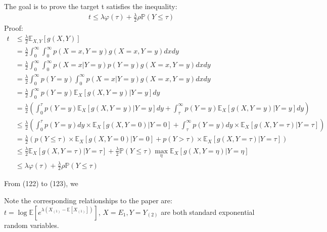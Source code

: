 \documentclass{article}
\theoremstyle{plain}
\begin{document}
The goal is to prove the target t satisfies the inequality:\\
\begin{align}
    t \leq \lambda \varphi(\tau) + \frac{\lambda}{2} \rho \mathbb{P}(Y \leq \tau)
\end{align}
Proof:
\begin{align}
    t & \leq  \frac{\lambda}{2} \mathbb{E}_{X, Y}[g(X, Y)]\\
    & = \frac{\lambda}{2}\int _0^{\infty} \int_0^{\infty} p(X = x, Y = y) g(X = x, Y = y) dxdy\\
    & = \frac{\lambda}{2}\int _0^{\infty} \int_0^{\infty} p(X = x|Y = y) p(Y = y)g(X = x, Y = y) dxdy\\
    & = \frac{\lambda}{2}\int _0^{\infty} p(Y = y) \int_0^{\infty} p(X = x|Y = y) g(X = x, Y = y) dxdy\\
    & = \frac{\lambda}{2}\int _0^{\infty} p(Y = y) \mathbb{E}_X[g(X, Y = y)| Y = y]dy\\
    & = \frac{\lambda}{2}\left(\int _0^{\tau} p(Y = y) \mathbb{E}_X[g(X, Y = y)| Y = y]dy + \int _\tau^{\infty} p(Y = y) \mathbb{E}_X[g(X, Y = y)| Y = y]dy\right)\\
    & \leq \frac{\lambda}{2}\left(\int _0^{\tau} p(Y = y) dy \times \mathbb{E}_X[g(X, Y = 0)| Y = 0] + \int _\tau^{\infty} p(Y = y) dy \times \mathbb{E}_X[g(X, Y = \tau)| Y = \tau] \right)\\
    & = \frac{\lambda}{2}\left(p(Y \leq \tau) \times \mathbb{E}_X[g(X, Y = 0)| Y = 0] + p(Y > \tau) \times \mathbb{E}_X[g(X, Y = \tau)| Y = \tau] \right)\\
    & \leq \frac{\lambda}{2} \mathbb{E}_X[g(X, Y = \tau)|Y = \tau] + \frac{\lambda}{2} \mathbb{P}(Y \leq \tau) \max_{\eta} \mathbb{E}_X[g(X, Y = \eta)|Y = \eta]\\
    & \leq \lambda \varphi(\tau) + \frac{\lambda}{2} \rho \mathbb{P}(Y \leq \tau)
\end{align}

From (122) to (123), we 

Note the corresponding relationships to the paper are:\\

$t = \log \mathbb{E} [e^{\lambda (X_{(1)} - \mathbb{E}[X_{(1)}])}]$, $X = E_1, Y = Y_{(2)}$ are both standard exponential random variables. 

\end{document}
